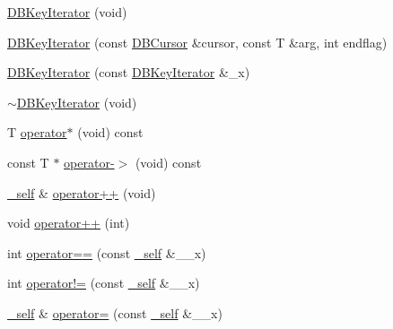 \begin{DoxyCompactItemize}
\item 
\mbox{\hyperlink{classFILEDB_1_1DBKeyIterator_aece085c0a59d87759e01613b5c64ef36}{D\+B\+Key\+Iterator}} (void)
\item 
\mbox{\hyperlink{classFILEDB_1_1DBKeyIterator_a7dc82bdde4a77bcadd704a3e87f6534a}{D\+B\+Key\+Iterator}} (const \mbox{\hyperlink{classFILEDB_1_1DBCursor}{D\+B\+Cursor}} \&cursor, const T \&arg, int endflag)
\item 
\mbox{\hyperlink{classFILEDB_1_1DBKeyIterator_ac1fa531110379c3deb566758095e8a0e}{D\+B\+Key\+Iterator}} (const \mbox{\hyperlink{classFILEDB_1_1DBKeyIterator}{D\+B\+Key\+Iterator}} \&\+\_\+x)
\item 
\mbox{\hyperlink{classFILEDB_1_1DBKeyIterator_a54300ef8000ed2910c47d931ee091113}{$\sim$\+D\+B\+Key\+Iterator}} (void)
\item 
T \mbox{\hyperlink{classFILEDB_1_1DBKeyIterator_ab3cfba3f2b19b6eb74ff614c62195ab4}{operator$\ast$}} (void) const
\item 
const T $\ast$ \mbox{\hyperlink{classFILEDB_1_1DBKeyIterator_a453e5281ba078f217558d44c049c564c}{operator-\/$>$}} (void) const
\item 
\mbox{\hyperlink{classFILEDB_1_1DBKeyIterator_aaf7773c7a848ec6e04bc738dd794ace1}{\+\_\+self}} \& \mbox{\hyperlink{classFILEDB_1_1DBKeyIterator_a7816155cac741f3f82dafa73028f4307}{operator++}} (void)
\item 
void \mbox{\hyperlink{classFILEDB_1_1DBKeyIterator_a364ac0414da6888e0b981f07b3239257}{operator++}} (int)
\item 
int \mbox{\hyperlink{classFILEDB_1_1DBKeyIterator_ab6d1aad1d07c4ee9a1edeadf6610c6f4}{operator==}} (const \mbox{\hyperlink{classFILEDB_1_1DBKeyIterator_aaf7773c7a848ec6e04bc738dd794ace1}{\+\_\+self}} \&\+\_\+\+\_\+x)
\item 
int \mbox{\hyperlink{classFILEDB_1_1DBKeyIterator_aa92d51bde395e8c546d9cbe1c65ef5e1}{operator!=}} (const \mbox{\hyperlink{classFILEDB_1_1DBKeyIterator_aaf7773c7a848ec6e04bc738dd794ace1}{\+\_\+self}} \&\+\_\+\+\_\+x)
\item 
\mbox{\hyperlink{classFILEDB_1_1DBKeyIterator_aaf7773c7a848ec6e04bc738dd794ace1}{\+\_\+self}} \& \mbox{\hyperlink{classFILEDB_1_1DBKeyIterator_adfa49c128d637dae0263553529126575}{operator=}} (const \mbox{\hyperlink{classFILEDB_1_1DBKeyIterator_aaf7773c7a848ec6e04bc738dd794ace1}{\+\_\+self}} \&\+\_\+\+\_\+x)
\end{DoxyCompactItemize}

